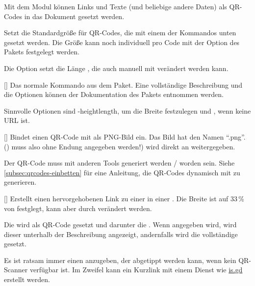 Mit dem Modul  können Links und Texte (und beliebige
andere Daten) als QR-Codes in das Dokument gesetzt werden.

\begin{options}
	\Default{1.5cm}
	Setzt die Standardgröße für QR-Codes, die mit einem der Kommandos unten
	gesetzt werden. Die Größe kann noch individuell pro Code mit der
	 Option des  Pakets festgelegt werden.

	Die Option setzt die Länge , die auch manuell mit
	 verändert werden kann.
\end{options}

\begin{commands}
	[]
	Das normale Kommando aus dem  Paket. Eine vollständige
	Beschreibung und die Optionen können der Dokumentation des Pakets
	entnommen werden.

	Sinnvolle Optionen sind \key*-{height}{length}, um die Breite festzulegen
	und , wenn  keine URL ist.


	[]
	Bindet einen QR-Code mit  als PNG-Bild ein.
	Das Bild hat den Namen \enquote{.png}. ()
	muss also ohne Endung angegeben werden!)
	 wird direkt an  weitergegeben.

	Der QR-Code
	muss mit anderen Tools generiert werden / worden sein. Siehe
	\autoref{subsec:qrcodes-einbetten} für eine Anleitung, die QR-Codes dynamisch
	mit  zu generieren.

	[]
	Erstellt einen hervorgehobenen Link zu einer  in einer
	. Die Breite ist auf 33\,\% von  festglegt,
	kann aber durch  verändert werden.

	Die  wird als QR-Code gesetzt und darunter die .
	Wenn  angegeben wird, wird dieser unterhalb der Beschreibung angezeigt,
	andernfalls wird die vollständige  gesetzt.

	Es ist ratsam immer einen  anzugeben, der abgetippt werden kann,
	wenn kein QR-Scanner verfügbar ist. Im Zweifel kann ein Kurzlink mit einem Dienst
	wie \hyperlink{https://www.is.gd}{is.gd} erstellt werden.
\end{commands}

